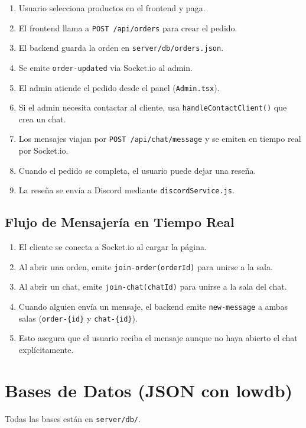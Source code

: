 \documentclass[12pt,a4paper]{article}
\begin{document}
\begin{enumerate}
  \item Usuario selecciona productos en el frontend y paga.
  \item El frontend llama a \texttt{POST /api/orders} para crear el pedido.
  \item El backend guarda la orden en \texttt{server/db/orders.json}.
  \item Se emite \texttt{order-updated} via Socket.io al admin.
  \item El admin atiende el pedido desde el panel (\texttt{Admin.tsx}).
  \item Si el admin necesita contactar al cliente, usa \texttt{handleContactClient()} que crea un chat.
  \item Los mensajes viajan por \texttt{POST /api/chat/message} y se emiten en tiempo real por Socket.io.
  \item Cuando el pedido se completa, el usuario puede dejar una reseña.
  \item La reseña se envía a Discord mediante \texttt{discordService.js}.
\end{enumerate}

\subsection{Flujo de Mensajería en Tiempo Real}

\begin{enumerate}
  \item El cliente se conecta a Socket.io al cargar la página.
  \item Al abrir una orden, emite \texttt{join-order(orderId)} para unirse a la sala.
  \item Al abrir un chat, emite \texttt{join-chat(chatId)} para unirse a la sala del chat.
  \item Cuando alguien envía un mensaje, el backend emite \texttt{new-message} a ambas salas (\texttt{order-\{id\}} y \texttt{chat-\{id\}}).
  \item Esto asegura que el usuario reciba el mensaje aunque no haya abierto el chat explícitamente.
\end{enumerate}

\newpage

\section{Bases de Datos (JSON con lowdb)}

Todas las bases están en \texttt{server/db/}.
\end{document}
